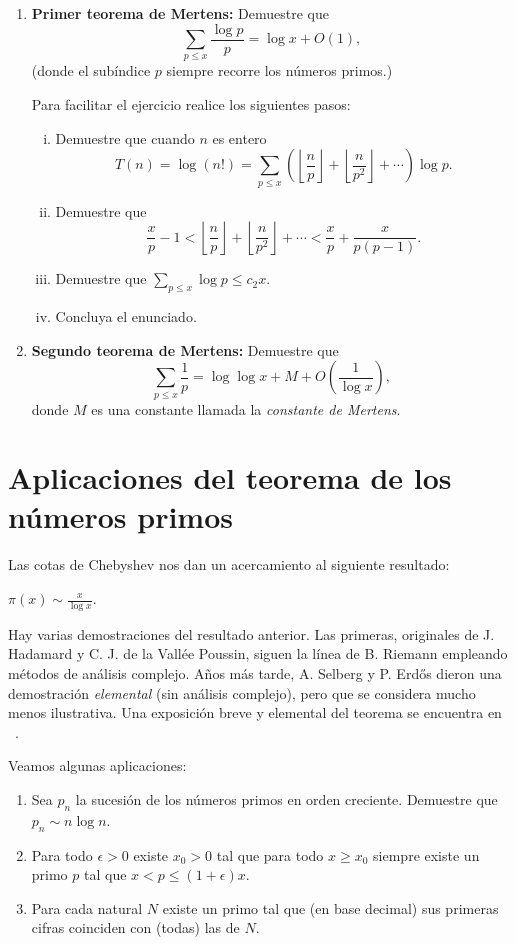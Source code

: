 \documentclass[11pt, reqno]{amsart}
\begin{document}
\begin{enumerate}[resume]
	\item \hard
		\textbf{Primer teorema de Mertens:} Demuestre que
		$$ \sum_{p\le x} \frac{\log p}{p} = \log x + O(1), $$
		(donde el subíndice $p$ siempre recorre los números primos.)

		Para facilitar el ejercicio realice los siguientes pasos:
		\begin{enumerate}[(i)]
			\item Demuestre que cuando $n$ es entero
				$$ T(n) = \log(n!) = \sum_{p \le x} \left( \left\lfloor \frac np \right\rfloor + \left\lfloor \frac{n}{p^2} \right\rfloor
				+ \cdots \right) \log p. $$
			\item Demuestre que
				$$ \frac{x}{p} - 1 < \left\lfloor \frac np \right\rfloor + \left\lfloor \frac{n}{p^2} \right\rfloor + \cdots
				< \frac{x}{p} + \frac{x}{p(p - 1)}. $$
			\item Demuestre que $\sum_{p \le x} \log p \le c_2 x$.
			\item Concluya el enunciado.
		\end{enumerate}

	\item \hard
		\textbf{Segundo teorema de Mertens:} Demuestre que
		$$ \sum_{p\le x} \frac{1}{p} = \log\log x + M + O\left( \frac{1}{\log x} \right), $$
		donde $M$ es una constante llamada la \textit{constante de Mertens}.
\end{enumerate}

\section{Aplicaciones del teorema de los números primos}
Las cotas de Chebyshev nos dan un acercamiento al siguiente resultado:
\begin{thm}
	$\displaystyle \pi(x) \sim \frac{x}{\log x}$.
\end{thm}

Hay varias demostraciones del resultado anterior.
Las primeras, originales de J. Hadamard y C. J. de la Vallée Poussin, siguen la línea de B. Riemann empleando métodos de análisis complejo.
Años más tarde, A. Selberg y P. Erd\H os dieron una demostración \textit{elemental} (sin análisis complejo), pero que se considera mucho menos ilustrativa.
Una exposición breve y elemental del teorema se encuentra en \citeauthor{richter21PNT}~\cite{richter21PNT}.

Veamos algunas aplicaciones:
\begin{enumerate}[resume]
	\item Sea $p_n$ la sucesión de los números primos en orden creciente.
		Demuestre que $p_n \sim n\log n$.
	\item Para todo $\epsilon > 0$ existe $x_0 > 0$ tal que para todo $x \ge x_0$
		siempre existe un primo $p$ tal que $x < p \le (1 + \epsilon)x$.
	\item Para cada natural $N$ existe un primo tal que (en base decimal) sus primeras cifras coinciden con (todas) las de $N$.
\end{enumerate}
\end{document}

